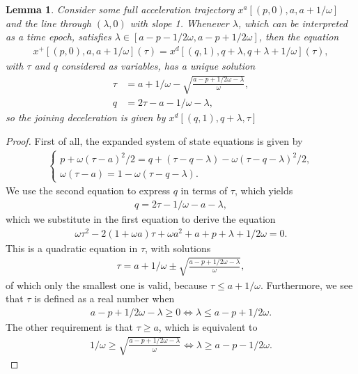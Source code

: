 \documentclass[a4paper]{report}
\theoremstyle{definition}
\theoremstyle{plain}
\newtheorem{lemma}{Lemma}[chapter]
\begin{document}
\begin{lemma}
  \label{lemma:line_acc}
  Consider some full acceleration trajectory $x^{a}[(p, 0), a, a+1/\omega]$ and the
  line through $(\lambda, 0)$ with slope 1. Whenever $\lambda$, which can be
  interpreted as a time epoch, satisfies $\lambda \in [a-p-1/2\omega, a-p+1/2\omega]$, then the equation
  \begin{align*}
    x^{+}[(p, 0), a, a+1/\omega](\tau) = x^{d}[(q, 1), q + \lambda, q + \lambda + 1/\omega](\tau) ,
  \end{align*}
  with $\tau$ and $q$ considered as variables, has a unique solution
  \begin{align*}
    \tau &= a + 1/\omega - \sqrt{\frac{a - p + 1/2\omega - \lambda}{\omega}} , \\
    q &= 2\tau - a - 1/\omega - \lambda ,
  \end{align*}
  so the joining deceleration is given by $x^{d}[(q,1), q + \lambda, \tau]$
\end{lemma}
\begin{proof}
  First of all, the expanded system of state equations is given by
  \begin{align*}
    \begin{cases}
    p + \omega (\tau - a)^{2}/2 = q + (\tau - q - \lambda) - \omega (\tau - q - \lambda)^{2}/2 , \\
    \omega(\tau - a) = 1 - \omega(\tau - q - \lambda) .
      \end{cases}
  \end{align*}
  We use the second equation to express $q$ in terms of $\tau$, which yields
  \begin{align*}
    q = 2\tau - 1/\omega -a - \lambda ,
  \end{align*}
  which we substitute in the first equation to derive the equation
  \begin{align*}
    \omega \tau^{2}  - 2 (1 + \omega a) \tau + \omega a^{2} + a + p + \lambda + 1/2\omega = 0 .
  \end{align*}
  This is a quadratic equation in $\tau$, with solutions
  \begin{align*}
    \tau = a + 1/\omega \pm \sqrt{\frac{a - p + 1/2\omega - \lambda}{\omega}} ,
  \end{align*}
  of which only the smallest one is valid, because $\tau \leq a + 1/\omega$.
  Furthermore, we see that $\tau$ is defined as a real number when
  \begin{align*}
    a - p + 1/2\omega - \lambda \geq 0 \iff \lambda \leq a - p + 1/2\omega .
  \end{align*}
  The other requirement is that $\tau \geq a$, which is equivalent to
  \begin{align*}
    1/\omega \geq \sqrt{\frac{a - p + 1/2\omega - \lambda}{\omega}} \iff
    \lambda \geq a - p - 1/2\omega .
  \end{align*}
\end{proof}
\end{document}
